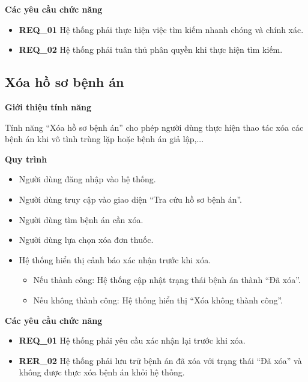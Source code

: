 \noindent \textbf{Các yêu cầu chức năng}
\begin{itemize}
    \item \textbf{REQ\_01} Hệ thống phải thực hiện việc tìm kiếm nhanh chóng và chính xác.
    \item \textbf{REQ\_02} Hệ thống phải tuân thủ phân quyền khi thực hiện tìm kiếm.
\end{itemize}

\subsection{Xóa hồ sơ bệnh án}

\noindent \textbf{Giới thiệu tính năng}

Tính năng ``Xóa hồ sơ bệnh án'' cho phép người dùng thực hiện thao tác xóa các bệnh án khi vô tình trùng lặp hoặc bệnh án giả lập,...

\noindent \textbf{Quy trình}
\begin{itemize}
    \item Người dùng đăng nhập vào hệ thống.
    \item Người dùng truy cập vào giao diện ``Tra cứu hồ sơ bệnh án''.
    \item Người dùng tìm bệnh án cần xóa.
    \item Người dùng lựa chọn xóa đơn thuốc.
    \item Hệ thống hiển thị cảnh báo xác nhận trước khi xóa.
    \begin{itemize}
        \item Nếu thành công: Hệ thống cập nhật trạng thái bệnh án thành ``Đã xóa''.
        \item Nếu không thành công: Hệ thống hiển thị ``Xóa không thành công''.
    \end{itemize}
\end{itemize}

\noindent \textbf{Các yêu cầu chức năng}
\begin{itemize}
    \item \textbf{REQ\_01} Hệ thống phải yêu cầu xác nhận lại trước khi xóa.
    \item \textbf{RER\_02} Hệ thống phải lưu trữ bệnh án đã xóa với trạng thái ``Đã xóa'' và không được thực xóa bệnh án khỏi hệ thống.
\end{itemize}